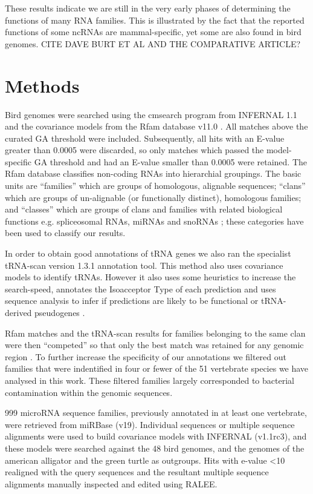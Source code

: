 \documentclass[10pt]{bmc_article}
\newenvironment{bmcformat}{\begin{raggedright}\baselineskip20pt\sloppy\setboolean{publ}{false}}{\end{raggedright}\baselineskip20pt\sloppy}
\begin{document}
\begin{bmcformat}
These results indicate we are still in the very early phases of
determining the functions of many RNA families. This is illustrated by
the fact that the reported functions of some ncRNAs are
mammal-specific, yet some are also found in bird genomes. CITE DAVE
BURT ET AL AND THE COMPARATIVE ARTICLE?

\section*{Methods}

Bird genomes were searched using the cmsearch program from INFERNAL
1.1 and the covariance models from the Rfam database
v11.0 \cite{Gardner:2011a,Burge:2013}. All matches above the curated GA
threshold were included. Subsequently, all hits with an E-value
greater than 0.0005 were discarded, so only matches which passed the
model-specific GA threshold and had an E-value smaller than 0.0005
were retained. The Rfam database classifies non-coding RNAs into
hierarchial groupings. The basic units are ``families'' which are
groups of homologous, alignable sequences; ``clans'' which are groups
of un-alignable (or functionally distinct), homologous families; and
``classes'' which are groups of clans and families with related
biological functions e.g. spliceosomal RNAs, miRNAs and snoRNAs
\cite{Griffiths-Jones:2003,Griffiths-Jones:2005,Gardner:2009,Gardner:2011a,Burge:2013};
these categories have been used to classify our results.

In order to obtain good annotations of tRNA genes we also ran the
specialist tRNA-scan version 1.3.1 annotation tool. This method also
uses covariance models to identify tRNAs. However it also uses some
heuristics to increase the search-speed, annotates the Isoacceptor
Type of each prediction and uses sequence analysis to infer if
predictions are likely to be functional or tRNA-derived pseudogenes
\cite{Lowe:1997,Chan:2009}.

Rfam matches and the tRNA-scan results for families belonging to the
same clan were then ``competed'' so that only the best match was
retained for any genomic region \cite{Gardner:2011a}.  To further
increase the specificity of our annotations we filtered out families
that were indentified in four or fewer of the 51 vertebrate species we
have analysed in this work. These filtered families largely
corresponded to bacterial contamination within the genomic sequences.

999 microRNA sequence families, previously annotated in at least one
vertebrate, were retrieved from miRBase (v19). Individual sequences or
multiple sequence alignments were used to build covariance models with
INFERNAL (v1.1rc3), and these models were searched against the 48 bird
genomes, and the genomes of the american alligator and the green
turtle as outgroups. Hits with e-value <10 realigned with the query
sequences and the resultant multiple sequence alignments manually
inspected and edited using RALEE.


\end{bmcformat}
\end{document}
